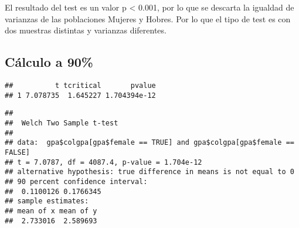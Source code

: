 \documentclass[
]{article}
\newenvironment{Shaded}{\begin{snugshade}}{\end{snugshade}}
\newcommand{\AttributeTok}[1]{\textcolor[rgb]{0.80,0.80,0.80}{#1}}
\newcommand{\CommentTok}[1]{\textcolor[rgb]{0.50,0.62,0.50}{#1}}
\newcommand{\ConstantTok}[1]{\textcolor[rgb]{0.86,0.64,0.64}{\textbf{#1}}}
\newcommand{\FloatTok}[1]{\textcolor[rgb]{0.75,0.75,0.82}{#1}}
\newcommand{\FunctionTok}[1]{\textcolor[rgb]{0.94,0.94,0.56}{#1}}
\newcommand{\NormalTok}[1]{\textcolor[rgb]{0.80,0.80,0.80}{#1}}
\newcommand{\SpecialCharTok}[1]{\textcolor[rgb]{0.86,0.64,0.64}{#1}}
\newcommand{\StringTok}[1]{\textcolor[rgb]{0.80,0.58,0.58}{#1}}
\begin{document}
El resultado del test es un valor p \textless{} 0.001, por lo que se
descarta la igualdad de varianzas de las poblaciones Mujeres y Hobres.
Por lo que el tipo de test es con dos muestras distintas y varianzas
diferentes.

\hypertarget{cuxe1lculo-a-90}{%
\subsection{Cálculo a 90\%}\label{cuxe1lculo-a-90}}

\begin{Shaded}
\end{Shaded}

\begin{verbatim}
##          t tcritical       pvalue
## 1 7.078735  1.645227 1.704394e-12
\end{verbatim}

\begin{Shaded}
\end{Shaded}

\begin{verbatim}
## 
##  Welch Two Sample t-test
## 
## data:  gpa$colgpa[gpa$female == TRUE] and gpa$colgpa[gpa$female == FALSE]
## t = 7.0787, df = 4087.4, p-value = 1.704e-12
## alternative hypothesis: true difference in means is not equal to 0
## 90 percent confidence interval:
##  0.1100126 0.1766345
## sample estimates:
## mean of x mean of y 
##  2.733016  2.589693
\end{verbatim}
\end{document}
